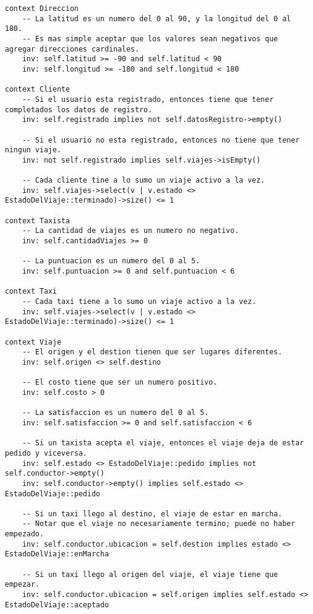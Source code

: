 \lstset{language=OCL}
\begin{lstlisting}[frame=single]
context Direccion
    -- La latitud es un numero del 0 al 90, y la longitud del 0 al 180.
    -- Es mas simple aceptar que los valores sean negativos que agregar direcciones cardinales.
    inv: self.latitud >= -90 and self.latitud < 90
    inv: self.longitud >= -180 and self.longitud < 180
    
context Cliente
    -- Si el usuario esta registrado, entonces tiene que tener completados los datos de registro.
    inv: self.registrado implies not self.datosRegistro->empty()

    -- Si el usuario no esta registrado, entonces no tiene que tener ningun viaje.
    inv: not self.registrado implies self.viajes->isEmpty()

    -- Cada cliente tine a lo sumo un viaje activo a la vez.
    inv: self.viajes->select(v | v.estado <> EstadoDelViaje::terminado)->size() <= 1
       
context Taxista
    -- La cantidad de viajes es un numero no negativo.
    inv: self.cantidadViajes >= 0

    -- La puntuacion es un numero del 0 al 5.
    inv: self.puntuacion >= 0 and self.puntuacion < 6

context Taxi
    -- Cada taxi tiene a lo sumo un viaje activo a la vez.
	inv: self.viajes->select(v | v.estado <> EstadoDelViaje::terminado)->size() <= 1

context Viaje
    -- El origen y el destion tienen que ser lugares diferentes.
	inv: self.origen <> self.destino

    -- El costo tiene que ser un numero positivo.
    inv: self.costo > 0

    -- La satisfaccion es un numero del 0 al 5.
    inv: self.satisfaccion >= 0 and self.satisfaccion < 6

    -- Si un taxista acepta el viaje, entonces el viaje deja de estar pedido y viceversa.
    inv: self.estado <> EstadoDelViaje::pedido implies not self.conductor->empty()
    inv: self.conductor->empty() implies self.estado <> EstadoDelViaje::pedido

    -- Si un taxi llego al destino, el viaje de estar en marcha.
    -- Notar que el viaje no necesariamente termino; puede no haber empezado.
    inv: self.conductor.ubicacion = self.destion implies estado <> EstadoDelViaje::enMarcha

    -- Si un taxi llego al origen del viaje, el viaje tiene que empezar.
    inv: self.conductor.ubicacion = self.origen implies self.estado <> EstadoDelViaje::aceptado

\end{lstlisting}

